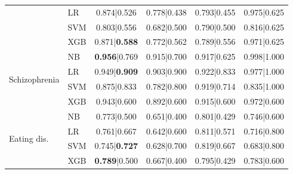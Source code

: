 \documentclass[11pt]{article}
\begin{document}
\begin{table}[t]
{\begin{tabular}{llcccc}
 & LR & 0.874|0.526 & 0.778|0.438 & 0.793|0.455 & 0.975|0.625 \\
 & SVM & 0.803|0.556 & 0.682|0.500 & 0.790|0.500 & 0.816|0.625 \\
 & XGB & 0.871|\textbf{0.588} & 0.772|0.562 & 0.789|0.556 & 0.971|0.625 \\
\midrule
\multirow{4}{*}{Schizophrenia}
 & NB & \textbf{0.956}|0.769 & 0.915|0.700 & 0.917|0.625 & 0.998|1.000 \\
 & LR & 0.949|\textbf{0.909} & 0.903|0.900 & 0.922|0.833 & 0.977|1.000 \\
 & SVM & 0.875|0.833 & 0.782|0.800 & 0.919|0.714 & 0.835|1.000 \\
 & XGB & 0.943|0.600 & 0.892|0.600 & 0.915|0.600 & 0.972|0.600 \\
\midrule
\multirow{4}{*}{Eating dis.}
 & NB & 0.773|0.500 & 0.651|0.400 & 0.801|0.429 & 0.746|0.600 \\
 & LR & 0.761|0.667 & 0.642|0.600 & 0.811|0.571 & 0.716|0.800 \\
 & SVM & 0.745|\textbf{0.727} & 0.628|0.700 & 0.819|0.667 & 0.683|0.800 \\
 & XGB & \textbf{0.789}|0.500 & 0.667|0.400 & 0.795|0.429 & 0.783|0.600 \\
\bottomrule
\end{tabular}%
}
\end{table}
\end{document}
